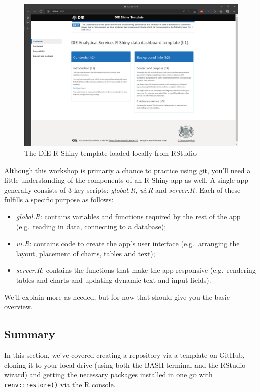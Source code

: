 \documentclass[
  12pt,
]{article}
\providecommand{\tightlist}{%
  \setlength{\itemsep}{0pt}\setlength{\parskip}{0pt}}
\begin{document}
\begin{figure}
\centering
\includegraphics{images/gitdemo/gitdemo-ShinyAppTemplate.PNG}
\caption{The DfE R-Shiny template loaded locally from RStudio}
\end{figure}

Although this workshop is primariy a chance to practice using git,
you'll need a little understanding of the components of an R-Shiny app
as well. A single app generally consists of 3 key scripts:
\emph{global.R}, \emph{ui.R} and \emph{server.R}. Each of these fulfills
a specific purpose as follows:

\begin{itemize}
\tightlist
\item
  \emph{global.R}: contains variables and functions required by the rest
  of the app (e.g.~reading in data, connecting to a database);
\item
  \emph{ui.R}: contains code to create the app's user interface
  (e.g.~arranging the layout, placement of charts, tables and text);
\item
  \emph{server.R}: contains the functions that make the app responsive
  (e.g.~rendering tables and charts and updating dynamic text and input
  fields).
\end{itemize}

We'll explain more as needed, but for now that should give you the basic
overview.

\hypertarget{summary}{%
\subsection{Summary}\label{summary}}

In this section, we've covered creating a repository via a template on
GitHub, cloning it to your local drive (using both the BASH terminal and
the RStudio wizard) and getting the necessary packages installed in one
go with \texttt{renv::restore()} via the R console.
\end{document}

